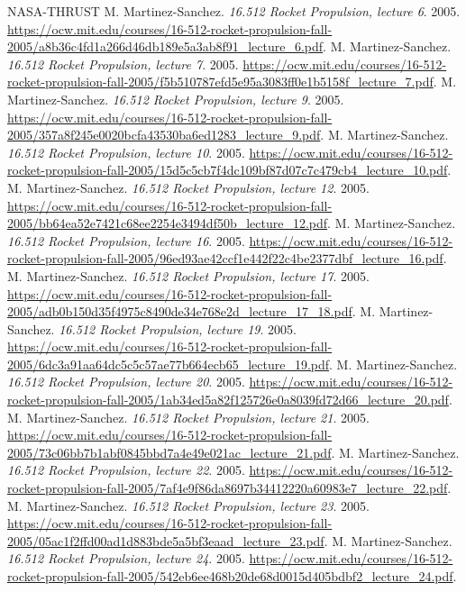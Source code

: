 \begin{thebibliography}{NASA-THRUST}
 M. Martinez-Sanchez. \emph{16.512 Rocket Propulsion, lecture 6}. 2005. \url{https://ocw.mit.edu/courses/16-512-rocket-propulsion-fall-2005/a8b36c4fd1a266d46db189e5a3ab8f91_lecture_6.pdf}.
 M. Martinez-Sanchez. \emph{16.512 Rocket Propulsion, lecture 7}. 2005. \url{https://ocw.mit.edu/courses/16-512-rocket-propulsion-fall-2005/f5b510787efd5e95a3083ff0e1b5158f_lecture_7.pdf}.
 M. Martinez-Sanchez. \emph{16.512 Rocket Propulsion, lecture 9}. 2005. \url{https://ocw.mit.edu/courses/16-512-rocket-propulsion-fall-2005/357a8f245e0020bcfa43530ba6ed1283_lecture_9.pdf}.
 M. Martinez-Sanchez. \emph{16.512 Rocket Propulsion, lecture 10}. 2005. \url{https://ocw.mit.edu/courses/16-512-rocket-propulsion-fall-2005/15d5c5cb7f4dc109bf87d07c7c479cb4_lecture_10.pdf}.
 M. Martinez-Sanchez. \emph{16.512 Rocket Propulsion, lecture 12}. 2005. \url{https://ocw.mit.edu/courses/16-512-rocket-propulsion-fall-2005/bb64ea52e7421c68ee2254e3494df50b_lecture_12.pdf}.
 M. Martinez-Sanchez. \emph{16.512 Rocket Propulsion, lecture 16}. 2005. \url{https://ocw.mit.edu/courses/16-512-rocket-propulsion-fall-2005/96ed93ae42ccf1e442f22c4be2377dbf_lecture_16.pdf}.
 M. Martinez-Sanchez. \emph{16.512 Rocket Propulsion, lecture 17}. 2005. \url{https://ocw.mit.edu/courses/16-512-rocket-propulsion-fall-2005/adb0b150d35f4975c8490de34e768e2d_lecture_17_18.pdf}.
 M. Martinez-Sanchez. \emph{16.512 Rocket Propulsion, lecture 19}. 2005. \url{https://ocw.mit.edu/courses/16-512-rocket-propulsion-fall-2005/6dc3a91aa64dc5c5c57ae77b664ecb65_lecture_19.pdf}.
 M. Martinez-Sanchez. \emph{16.512 Rocket Propulsion, lecture 20}. 2005. \url{https://ocw.mit.edu/courses/16-512-rocket-propulsion-fall-2005/1ab34ed5a82f125726e0a8039fd72d66_lecture_20.pdf}.
 M. Martinez-Sanchez. \emph{16.512 Rocket Propulsion, lecture 21}. 2005. \url{https://ocw.mit.edu/courses/16-512-rocket-propulsion-fall-2005/73c06bb7b1abf0845bbd7a4e49e021ac_lecture_21.pdf}.
 M. Martinez-Sanchez. \emph{16.512 Rocket Propulsion, lecture 22}. 2005. \url{https://ocw.mit.edu/courses/16-512-rocket-propulsion-fall-2005/7af4e9f86da8697b34412220a60983e7_lecture_22.pdf}.
 M. Martinez-Sanchez. \emph{16.512 Rocket Propulsion, lecture 23}. 2005. \url{https://ocw.mit.edu/courses/16-512-rocket-propulsion-fall-2005/05ac1f2ffd00ad1d883bde5a5bf3eaad_lecture_23.pdf}.
 M. Martinez-Sanchez. \emph{16.512 Rocket Propulsion, lecture 24}. 2005. \url{https://ocw.mit.edu/courses/16-512-rocket-propulsion-fall-2005/542eb6ee468b20de68d0015d405bdbf2_lecture_24.pdf}.

\end{thebibliography}
